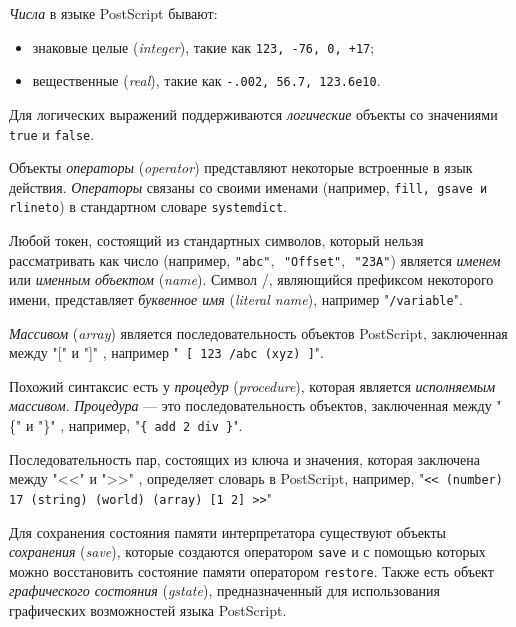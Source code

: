 \documentclass[14pt]{extarticle}
\begin{document}
\textit{Числа} в языке PostScript бывают:
\begin{itemize}
\item знаковые целые (\textit{integer}), такие как \texttt{123, -76, 0, +17};
\item вещественные (\textit{real}), такие как \texttt{-.002, 56.7, 123.6e10}.
\end{itemize} 

Для логических выражений поддерживаются \textit{логические} объекты со значениями \texttt{true} и \texttt{false}. 

Объекты \textit{операторы} (\textit{operator})  представляют некоторые встроенные в язык действия. \textit{Операторы} связаны со своими именами (например, \texttt{fill, gsave и rlineto}) в стандартном словаре \texttt{systemdict}.


Любой токен, состоящий из стандартных символов, который нельзя рассматривать как число (например, \texttt{"abc"$,$ "Offset"$,$ "23A"}) является \textit{именем} или \textit{именным объектом} (\textit{name}). 
Символ /, являющийся префиксом некоторого имени, представляет \textit{буквенное имя} (\textit{literal name}), например "\texttt{/variable}".

\textit{Массивом} (\textit{array}) является последовательность объектов PostScript, заключенная между "[" и "]" $ $, например "\texttt{ [ 123  /abc (xyz) ]}".

Похожий синтаксис есть у \textit{процедур } (\textit{procedure}), которая является \textit{исполняемым массивом}. \textit{Процедура} --- это последовательность объектов, заключенная между "\{" и "\}"$ $ , например, "\texttt{\{ add 2 div \}}".

Последовательность пар, состоящих из ключа и значения, которая заключена между "$ $<<" и "$ $>>"$ $ , определяет словарь в PostScript, например, "\texttt {<< (number) 17 (string) (world) (array) [1 2]  >>}"

Для сохранения состояния памяти интерпретатора существуют объекты \textit{сохранения} (\textit{save}), которые создаются оператором \texttt{save} и с помощью которых можно восстановить состояние памяти оператором \texttt{restore}. Также есть объект \textit{графического состояния} (\textit{gstate}), предназначенный для использования графических возможностей языка PostScript.
\end{document}
